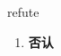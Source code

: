 
\begin{frame}
{\huge refute}
\begin{center}
\begin{enumerate}\Large
  \item \textbf{否认}
\end{enumerate}
\end{center}
\end{frame}
